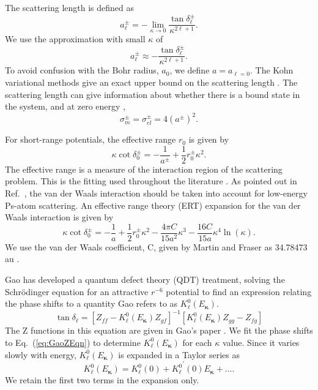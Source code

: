 \documentclass[preprint,showpacs,showkeys,preprintnumbers,amsmath,amssymb,longbibliography,pra,aps]{revtex4-1}
\begin{document}
The scattering length is defined as \cite{Bransden2003}
\begin{equation}
\label{eq:ScatLen}
a_\ell^\pm = -\lim_{\kappa \to 0}
  \frac{\tan{\delta_\ell^\pm}}{\kappa^{2\ell+1}}.
\end{equation}
We use the approximation with small $\kappa$ of
\begin{equation}
\label{eq:ScatLenApprox}
a_\ell^\pm \approx
  - \frac{\tan{\delta_\ell^\pm}}{\kappa^{2\ell+1}}.
\end{equation}
To avoid confusion with the Bohr radius, $a_0$, we define $a = a_{\ell=0}$. The
Kohn variational methods give an exact upper bound on the scattering length
\cite{Joachain1979}. The scattering length can give information about whether
there is a bound state in the system, and at zero energy \cite{Buckman1989},
\begin{equation}
\label{eq:ScatLenCross}
\sigma_m^\pm = \sigma_{el}^\pm = 4 (a^\pm)^2 .
\end{equation}

For short-range potentials, the effective range $r_0$ is given by
\cite{Bethe1949,Blatt1949}
\begin{equation}
\label{eq:EffectiveRangeShort}
\kappa \cot\delta_0^\pm = -\frac{1}{a^\pm} + \frac{1}{2} r_0^\pm \kappa^2.
\end{equation}
The effective range is a measure of the interaction region of the scattering
problem. This is the fitting used throughout the literature
\cite{Ivanov2002,VanReeth2003,Blackwood2002,Walters2004}. As pointed out in
Ref.~\cite{Fabrikant2014}, the van der Waals interaction should be taken into
account for low-energy Ps-atom scattering. An effective range theory (ERT)
expansion for the van der Waals interaction is given by \cite{Drake2006}
\begin{equation}
\label{eq:EffectiveRangeLongAu}
\kappa \cot\delta_0^\pm = -\frac{1}{a} + \frac{1}{2} r_0^\pm \kappa^2 - 
  \frac{4 \pi C}{15 a^2} \kappa^3 - 
  \frac{16 C}{15 a} \kappa^4 \ln \left(\kappa \right).
\end{equation}
We use the van der Waals coefficient, C, given by Martin and Fraser as
34.78473 au \cite{Martin1980}.

Gao \cite{Gao1998} has developed a quantum defect theory (QDT) treatment,
solving the Schr\"{o}dinger equation for an attractive $r^{-6}$ potential
to find an expression relating the phase shifts to a quantity Gao refers
to as $K_\ell^0(E_{\bm \kappa})$.
\begin{equation}
\label{eq:GaoZEqn}
\tan\delta_\ell = [Z_{ff} - K_\ell^0(E_{\bm \kappa}) Z_{gf}]^{-1}
  [K_\ell^0(E_{\bm \kappa}) Z_{gg} - Z_{fg}]
\end{equation}
The Z functions in this equation are given in Gao's paper \cite{Gao1998}. We 
fit the phase shifts to Eq.~(\ref{eq:GaoZEqn}) to determine
$K_\ell^0(E_{\bm \kappa})$ 
for each $\kappa$ value. Since it varies slowly with energy,
$K_\ell^0(E_{\bm \kappa})$ is expanded in a Taylor series as
\begin{equation}
\label{eq:GaoKTaylor}
K_\ell^0(E_{\bm \kappa}) = K_\ell^0(0) + {K_\ell^0}^\prime(0) E_{\bm \kappa}
  + \ldots.
\end{equation}
We retain the first two terms in the expansion only.
\end{document}
